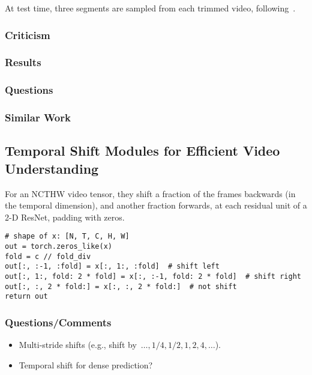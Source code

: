\documentclass[a4paper, 12pt]{article}
\begin{document}
At test time, three segments are sampled from each trimmed video,
following~\citet{DBLP:journals/corr/WangXW0LTG16}.

\subsubsection{Criticism}

\subsubsection{Results}

\subsubsection{Questions}

\subsubsection{Similar Work}


\subsection{Temporal Shift Modules for Efficient Video
            Understanding~\cite{lin2018temporal}}

For an NCTHW video tensor, they shift a fraction of the frames backwards (in
the temporal dimension), and another fraction forwards, at each residual unit
of a 2-D ResNet, padding with zeros.

\begin{verbatim}
# shape of x: [N, T, C, H, W]
out = torch.zeros_like(x)
fold = c // fold_div
out[:, :-1, :fold] = x[:, 1:, :fold]  # shift left
out[:, 1:, fold: 2 * fold] = x[:, :-1, fold: 2 * fold]  # shift right
out[:, :, 2 * fold:] = x[:, :, 2 * fold:]  # not shift
return out
\end{verbatim}


\subsubsection{Questions/Comments}

\begin{itemize}
        \item Multi-stride shifts (e.g., shift
                by~$\dots, 1/4, 1/2, 1, 2, 4, \dots$).

        \item Temporal shift for dense prediction?
\end{itemize}
\end{document}
